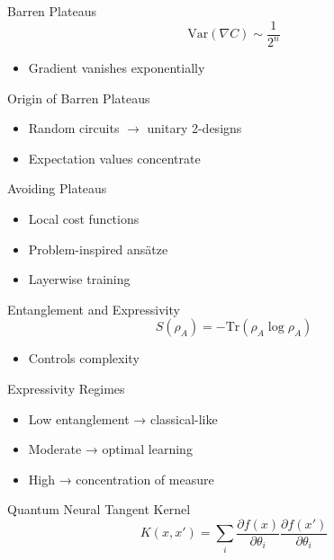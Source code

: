 \documentclass{beamer}
\begin{document}
\begin{frame}{Barren Plateaus}
\[
\mathrm{Var}(\nabla C) \sim \frac{1}{2^n}
\]

\begin{itemize}
\item Gradient vanishes exponentially
\end{itemize}
\end{frame}

\begin{frame}{Origin of Barren Plateaus}
\begin{itemize}
\item Random circuits $\rightarrow$ unitary 2-designs
\item Expectation values concentrate
\end{itemize}
\end{frame}

\begin{frame}{Avoiding Plateaus}
\begin{itemize}
\item Local cost functions
\item Problem-inspired ansätze
\item Layerwise training
\end{itemize}
\end{frame}

\begin{frame}{Entanglement and Expressivity}
\[
S(\rho_A) = -\mathrm{Tr}(\rho_A \log \rho_A)
\]

\begin{itemize}
\item Controls complexity
\end{itemize}
\end{frame}

\begin{frame}{Expressivity Regimes}
\begin{itemize}
\item Low entanglement → classical-like
\item Moderate → optimal learning
\item High → concentration of measure
\end{itemize}
\end{frame}

\begin{frame}{Quantum Neural Tangent Kernel}
\[
K(x,x') = \sum_i \frac{\partial f(x)}{\partial \theta_i}
\frac{\partial f(x')}{\partial \theta_i}
\]
\end{frame}
\end{document}
